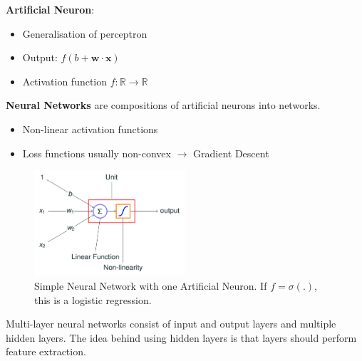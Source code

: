 \documentclass[11pt, %
	oneside, %
	english, %
	onehalfspacing, %
	parskip, %
	]{article} %
\theoremstyle{definition}
\begin{document}
\textbf{Artificial Neuron}:
\begin{itemize}
	\item Generalisation of perceptron
	\item Output: $f(b+\mathbf{w} \cdot \mathbf{x})$
	\item Activation function $f: \mathbb{R} \rightarrow \mathbb{R}$
\end{itemize}
\textbf{Neural Networks} are compositions of artificial neurons into networks.

\begin{itemize}
	\item Non-linear activation functions
	\item Loss functions usually non-convex $\to$ Gradient Descent
\end{itemize}


\begin{figure}[ht!]
    \caption{Simple Neural Network with one Artificial Neuron. If $f = \sigma(.)$, this is a logistic regression.}
    \label{fig.simplenn}
    \begin{center}
        \includegraphics[width = 0.5\textwidth]{simplenn.pdf}
    \end{center}
\end{figure}


Multi-layer neural networks consist of input and output layers and multiple hidden layers. The idea behind using hidden layers is that layers should perform feature extraction.
\end{document}
